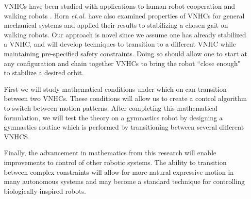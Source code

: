 \documentclass[a4paper,12pt]{article}
\begin{document}
VNHCs have been studied with applications to human-robot cooperation
\cite{vnhc-human-robot-coop} and walking robots \cite{vnhc-biped-robot}. Horn
\textit{et.al.} \cite{hybrid_zero_dynamics_bipedal_nhvcs} have also examined
properties of VNHCs for general mechanical systems and applied their results to
stabilizing a chosen gait on walking robots. Our approach is novel since we 
assume one has already stabilized a VNHC, and will develop techniques to
transition to a different VNHC while maintaining pre-specified safety
constraints. Doing so should allow one to start at any configuration and chain
together VNHCs to bring the robot ``close enough" to stabilize a desired orbit.

First we will study mathematical conditions under which on can transition
between two VNHCs. These conditions will allow us to create a control algorithm
to switch between motion patterns. After completing this mathematical
formulation, we will test the theory on a gymnastics robot by designing a
gymnastics routine which is performed by transitioning between several different
VNHCS. 

Finally, the advancement in mathematics from this research will enable
improvements to control of other robotic systems. The ability to transition
between complex constraints will allow for more natural expressive motion in
many autonomous systems and may become a standard technique for controlling
biologically inspired robots.

\printbibliography
\end{document}
